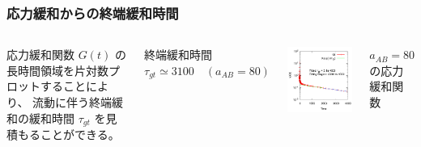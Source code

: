 \documentclass[12pt, dvipdfmx]{beamer}
\begin{document}
\begin{frame}

\frametitle{応力緩和からの終端緩和時間}
	\begin{columns}[T, totalwidth=\linewidth]
		応力緩和関数 $G(t)$ の長時間領域を片対数プロットすることにより、
		流動に伴う終端緩和の緩和時間 $\tau_{gt}$ を見積もることができる。

		\begin{alertblock}{終端緩和時間}
		\centering
		$\tau_{gt} \simeq 3100 \quad (a_{AB} = 80)$
		\end{alertblock}
		
		\includegraphics[width=\columnwidth]{./fig/AB80/gt_80.pdf}

	\centering
	$a_{AB} = 80$ の応力緩和関数
	\end{columns}
\end{frame}
\end{document}
